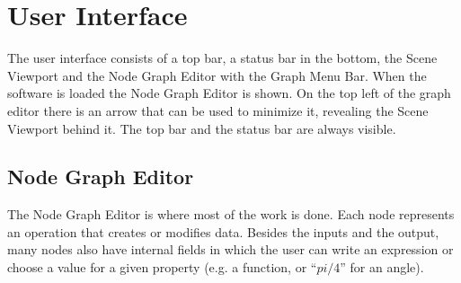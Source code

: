 \chapter{User Interface}

The user interface consists of a top bar, a status bar in the bottom,
the Scene Viewport and the Node Graph Editor with the Graph Menu Bar.
When the software is loaded the Node Graph Editor is shown. On the top left
of the graph editor there is an arrow that can be used to minimize it,
revealing the Scene Viewport behind it. The top bar and the status bar are
always visible.

\section{Node Graph Editor}

The Node Graph Editor is where most of the work is done.
Each node represents an operation that creates or modifies data. Besides the inputs and
the output, many nodes also have internal fields in which the user can write an expression
or choose a value for a given property (e.g. a function, or ``$pi/4$'' for an angle).

